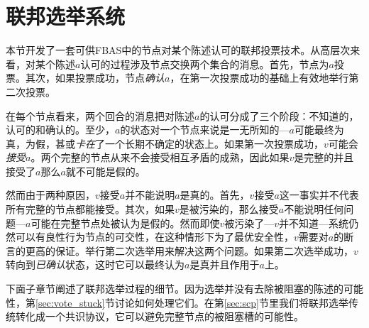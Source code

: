 \section{联邦选举系统}

本节开发了一套可供FBAS中的节点对某个陈述认可的联邦投票技术。从高层次来看，对某个陈述$a$认可的过程涉及节点交换两个集合的消息。首先，节点为$a$投票。其次，如果投票成功，节点\textit{确认}$a$，在第一次投票成功的基础上有效地举行第二次投票。

在每个节点看来，两个回合的消息把对陈述$a$的认可分成了三个阶段：不知道的，认可的和确认的。至少，$a$的状态对一个节点来说是一无所知的---$a$可能最终为真，为假，甚或\textit{卡在}了一个长期不确定的状态上。如果第一次投票成功，$v$可能会\textit{接受}$a$。两个完整的节点从来不会接受相互矛盾的成熟，因此如果$v$是完整的并且接受了$a$那么$a$就不可能是假的。

然而由于两种原因，$v$接受$a$并不能说明$a$是真的。首先，$v$接受$a$这一事实并不代表所有完整的节点都能接受。其次，如果$v$是被污染的，那么接受$a$不能说明任何问题---$a$可能在完整节点处被认为是假的。然而即使$v$被污染了---$v$并不知道---系统仍然可以有良性行为节点的{\quorum}可交性，在这种情形下为了最优安全性，$v$需要对$a$的断言的更高的保证。举行第二次选举用来解决这两个问题。如果第二次选举成功，$v$转向到\textit{已确认}状态，这时它可以最终认为$a$是真并且作用于$a$上。

下面子章节阐述了联邦选举过程的细节。因为选举并没有去除被阻塞的陈述的可能性，第\ref{sec:vote_stuck}节讨论如何处理它们。在第\ref{sec:scp}节里我们将联邦选举传统转化成一个共识协议，它可以避免完整节点的被阻塞槽的可能性。






